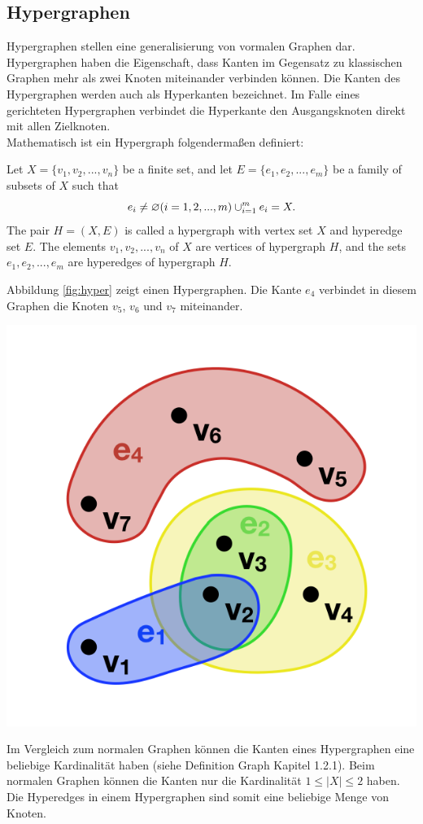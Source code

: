 \subsection{Hypergraphen}
Hypergraphen stellen eine generalisierung von vormalen Graphen dar.
Hypergraphen haben die Eigenschaft, dass Kanten im Gegensatz zu klassischen Graphen mehr als zwei Knoten miteinander verbinden können.
Die Kanten des Hypergraphen werden auch als Hyperkanten bezeichnet.
Im Falle eines gerichteten Hypergraphen verbindet die Hyperkante den Ausgangsknoten direkt mit allen Zielknoten.
\\Mathematisch ist ein Hypergraph folgendermaßen definiert:
\begin{definition}
	Let $X=\{v_{1}, v_{2},...,v_{n}\}$ be a finite set,
	and let $E=\{e_{1},e_{2},...,e_{m}\}$ be a family of subsets of $X$ such that
	\[e_{i} \neq \varnothing (i=1,2,...,m) \\
	\cup_{i=1}^{m}e_{i}=X.
	\]
	The pair $H=(X,E)$ is called a hypergraph with vertex set $X$
	and hyperedge set $E$. The elements $v_{1}, v_{2},...,v_{n}$ of $X$ are vertices
	of hypergraph $H$, and the sets $e_{1}, e_{2},...,e_{m}$ are hyperedges of hypergraph $H$.\cite[Seite 2]{zhang2018hypergraph}
\end{definition}
Abbildung \ref{fig:hyper} zeigt einen Hypergraphen.
Die Kante $e_{4}$ verbindet in diesem Graphen die Knoten $v_{5}$, $v_{6}$ und $v_{7}$ miteinander.
\begin{center}
	\includegraphics[scale = 0.5]{./images/Hypergraph2.png}
	\label{fig:hyper}
\end{center}
Im Vergleich zum normalen Graphen können die Kanten eines Hypergraphen eine beliebige Kardinalität haben (siehe Definition Graph Kapitel 1.2.1).
Beim normalen Graphen können die Kanten nur die Kardinalität $1 \leq |X| \leq 2$ haben.
Die Hyperedges in einem Hypergraphen sind somit eine beliebige Menge von Knoten.

